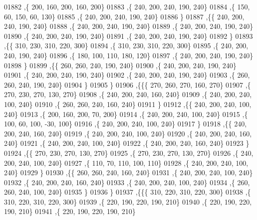 \begin{DoxyCode}
01882     ,\{   200,   160,   200,   160,   200\}
01883     ,\{   240,   200,   240,   190,   240\}
01884     ,\{   150,    60,   150,    60,   130\}
01885     ,\{   240,   200,   240,   190,   240\}
01886     \}
01887    ,\{\{   240,   200,   240,   190,   240\}
01888     ,\{   240,   200,   240,   190,   240\}
01889     ,\{   240,   200,   240,   190,   240\}
01890     ,\{   240,   200,   240,   190,   240\}
01891     ,\{   240,   200,   240,   190,   240\}
01892     \}
01893    ,\{\{   310,   230,   310,   220,   300\}
01894     ,\{   310,   230,   310,   220,   300\}
01895     ,\{   240,   200,   240,   190,   240\}
01896     ,\{   180,   100,   110,   180,   120\}
01897     ,\{   240,   200,   240,   190,   240\}
01898     \}
01899    ,\{\{   260,   260,   240,   190,   240\}
01900     ,\{   240,   200,   240,   190,   240\}
01901     ,\{   240,   200,   240,   190,   240\}
01902     ,\{   240,   200,   240,   190,   240\}
01903     ,\{   260,   260,   240,   190,   240\}
01904     \}
01905    \}
01906   ,\{\{\{   270,   260,   270,   160,   270\}
01907     ,\{   270,   230,   270,   130,   270\}
01908     ,\{   240,   200,   240,   160,   240\}
01909     ,\{   240,   200,   240,   100,   240\}
01910     ,\{   260,   260,   240,   160,   240\}
01911     \}
01912    ,\{\{   240,   200,   240,   100,   240\}
01913     ,\{   200,   160,   200,    70,   200\}
01914     ,\{   240,   200,   240,   100,   240\}
01915     ,\{   100,    60,   100,   -30,   100\}
01916     ,\{   240,   200,   240,   100,   240\}
01917     \}
01918    ,\{\{   240,   200,   240,   160,   240\}
01919     ,\{   240,   200,   240,   100,   240\}
01920     ,\{   240,   200,   240,   160,   240\}
01921     ,\{   240,   200,   240,   100,   240\}
01922     ,\{   240,   200,   240,   160,   240\}
01923     \}
01924    ,\{\{   270,   230,   270,   130,   270\}
01925     ,\{   270,   230,   270,   130,   270\}
01926     ,\{   240,   200,   240,   100,   240\}
01927     ,\{   110,    70,   110,   100,   110\}
01928     ,\{   240,   200,   240,   100,   240\}
01929     \}
01930    ,\{\{   260,   260,   240,   160,   240\}
01931     ,\{   240,   200,   240,   100,   240\}
01932     ,\{   240,   200,   240,   160,   240\}
01933     ,\{   240,   200,   240,   100,   240\}
01934     ,\{   260,   260,   240,   100,   240\}
01935     \}
01936    \}
01937   ,\{\{\{   310,   220,   310,   220,   300\}
01938     ,\{   310,   220,   310,   220,   300\}
01939     ,\{   220,   190,   220,   190,   210\}
01940     ,\{   220,   190,   220,   190,   210\}
01941     ,\{   220,   190,   220,   190,   210\}

\end{DoxyCode}
